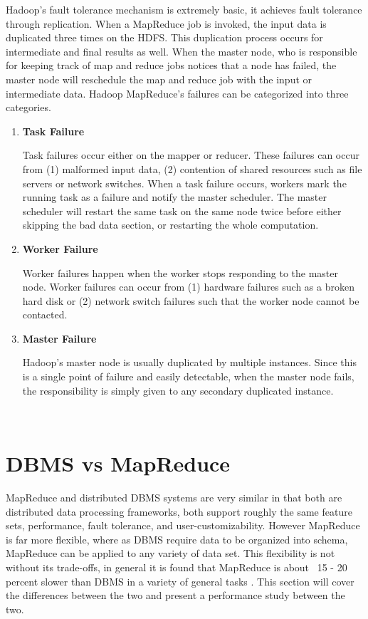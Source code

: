 \documentclass[10pt,twocolumn]{IEEEtran11}
\begin{document}
Hadoop's fault tolerance mechanism is extremely basic, it achieves fault tolerance through replication.  When a MapReduce job is invoked, the input data is duplicated three times on the HDFS.  This duplication process occurs for intermediate and final results as well.  When the master node, who is responsible for keeping track of map and reduce jobs notices that a node has failed, the master node will reschedule the map and reduce job with the input or intermediate data.  Hadoop MapReduce's failures can be categorized into three categories.
\ \\
\begin{enumerate}
	\setlength\itemsep{1em}
	\item 
	
	\textbf{Task Failure}
	
	Task failures occur either on the mapper or reducer.  These failures can occur from (1) malformed input data, (2) contention of shared resources such as file servers or network switches.
	When a task failure occurs, workers mark the running task as a failure and notify the master scheduler.  The master scheduler will restart the same task on the same node twice before either skipping the bad data section, or restarting the whole computation.
	\item 
	
	\textbf{Worker Failure}
	
	Worker failures happen when the worker stops responding to the master node.  Worker failures can occur from (1) hardware failures such as a broken hard disk or (2) network switch failures such that the worker node cannot be contacted.
	
	\item 
	
	\textbf{Master Failure}
	
	Hadoop's master node is usually duplicated by multiple instances.  Since this is a single point of failure and easily detectable, when the master node fails, the responsibility is simply given to any secondary duplicated instance.
\end{enumerate}
\ \\

\section{DBMS vs MapReduce}
MapReduce and distributed DBMS systems are very similar in that both are distributed data processing frameworks, both support roughly the same feature sets, performance, fault tolerance, and user-customizability.  However MapReduce is far more flexible,  where as DBMS require data to be organized into schema, MapReduce can be applied to any variety of data set.  This flexibility is not without its trade-offs, in general it is found that MapReduce is about ~15 - 20 percent slower than DBMS in a variety of general tasks \cite{pavlo2009comparison}.  This section will cover the differences between the two and present a performance study between the two.
\end{document}
